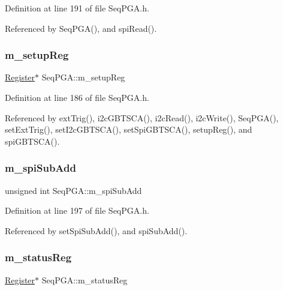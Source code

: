 Definition at line 191 of file Seq\+P\+G\+A.\+h.



Referenced by Seq\+P\+G\+A(), and spi\+Read().

\mbox{\label{classSeqPGA_a03269241e7fc26493cd0595beda334c2}} 
\subsubsection{\texorpdfstring{m\+\_\+setup\+Reg}{m\_setupReg}}
{\footnotesize\ttfamily \hyperlink{classRegister}{Register}$\ast$ Seq\+P\+G\+A\+::m\+\_\+setup\+Reg\hspace{0.3cm}{\ttfamily [private]}}



Definition at line 186 of file Seq\+P\+G\+A.\+h.



Referenced by ext\+Trig(), i2c\+G\+B\+T\+S\+C\+A(), i2c\+Read(), i2c\+Write(), Seq\+P\+G\+A(), set\+Ext\+Trig(), set\+I2c\+G\+B\+T\+S\+C\+A(), set\+Spi\+G\+B\+T\+S\+C\+A(), setup\+Reg(), and spi\+G\+B\+T\+S\+C\+A().

\mbox{\label{classSeqPGA_afd5442d9b92f9b59bd553df9bd91dd87}} 
\subsubsection{\texorpdfstring{m\+\_\+spi\+Sub\+Add}{m\_spiSubAdd}}
{\footnotesize\ttfamily unsigned int Seq\+P\+G\+A\+::m\+\_\+spi\+Sub\+Add\hspace{0.3cm}{\ttfamily [private]}}



Definition at line 197 of file Seq\+P\+G\+A.\+h.



Referenced by set\+Spi\+Sub\+Add(), and spi\+Sub\+Add().

\mbox{\label{classSeqPGA_ae39eb15fbde7a4a48376c8cbdbbceeaa}} 
\subsubsection{\texorpdfstring{m\+\_\+status\+Reg}{m\_statusReg}}
{\footnotesize\ttfamily \hyperlink{classRegister}{Register}$\ast$ Seq\+P\+G\+A\+::m\+\_\+status\+Reg\hspace{0.3cm}{\ttfamily [private]}}



